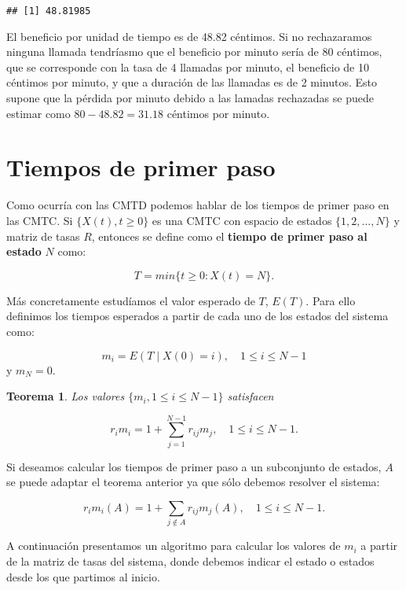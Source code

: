 \documentclass[
]{book}
\newtheorem{theorem}{Teorema}[chapter]
\theoremstyle{definition}
\theoremstyle{definition}
\theoremstyle{definition}
\theoremstyle{definition}
\theoremstyle{remark}
\begin{document}
\begin{verbatim}
## [1] 48.81985
\end{verbatim}

El beneficio por unidad de tiempo es de 48.82 céntimos. Si no rechazaramos ninguna llamada tendríasmo que el beneficio por minuto sería de 80 céntimos, que se corresponde con la tasa de 4 llamadas por minuto, el beneficio de 10 céntimos por minuto, y que a duración de las llamadas es de 2 minutos. Esto supone que la pérdida por minuto debido a las lamadas rechazadas se puede estimar como \(80 - 48.82 = 31.18\) céntimos por minuto.

\hypertarget{CMTCJ}{%
\section{Tiempos de primer paso}\label{CMTCJ}}

Como ocurría con las CMTD podemos hablar de los tiempos de primer paso en las CMTC. Si \(\{X(t), t \geq 0\}\) es una CMTC con espacio de estados \(\{1, 2,...,N\}\) y matriz de tasas \(R\), entonces se define como el \textbf{tiempo de primer paso al estado} \(N\) como:

\[T = min\{t \geq 0: X(t) = N\}.\]

Más concretamente estudíamos el valor esperado de \(T\), \(E(T)\). Para ello definimos los tiempos esperados a partir de cada uno de los estados del sistema como:

\[m_i = E(T \mid X(0) = i), \quad 1 \leq i \leq N-1\] y \(m_N = 0.\)

\begin{theorem}
Los valores \(\{m_i, 1 \leq i \leq N-1\}\) satisfacen

\[r_im_i = 1 + \sum_{j=1}^{N-1} r_{ij}m_j, \quad 1\leq i \leq N-1.\]
\end{theorem}

Si deseamos calcular los tiempos de primer paso a un subconjunto de estados, \(A\) se puede adaptar el teorema anterior ya que sólo debemos resolver el sistema:

\[r_im_i(A) = 1 + \sum_{j \notin A} r_{ij}m_j(A), \quad 1\leq i \leq N-1.\]

A continuación presentamos un algoritmo para calcular los valores de \(m_i\) a partir de la matriz de tasas del sistema, donde debemos indicar el estado o estados desde los que partimos al inicio.
\end{document}
